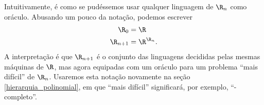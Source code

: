 Intuitivamente, é como se pudéssemos usar qualquer linguagem de $\R_n$ como oráculo.
Abusando um pouco da notação,
podemos escrever
\begin{align*}
    \R_0 &= \R \\
    \R_{n+1} &= \R^{\R_n}.
\end{align*}
A interpretação é que $\R_{n+1}$ é o conjunto das linguagens
decididas pelas mesmas máquinas de $\R$,
mas agora equipadas com um oráculo para um problema ``mais difícil'' de $\R_n$.
Usaremos esta notação novamente na seção \ref{hierarquia_polinomial},
em que ``mais difícil'' significará,
por exemplo, ``\NP-completo''.
